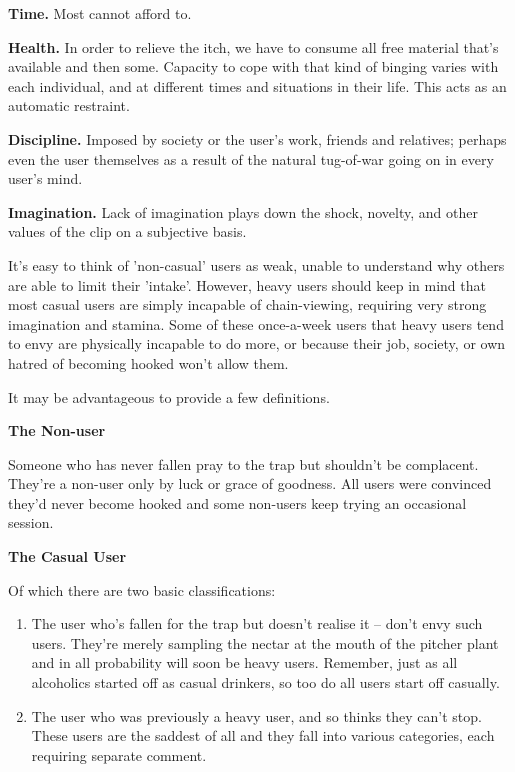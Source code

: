 \documentclass[
]{book}
\begin{document}
\textbf{Time.}
Most cannot afford to.

\textbf{Health.}
In order to relieve the itch, we have to consume all free material that's available and then some. Capacity to cope with that kind of binging varies with each individual, and at different times and situations in their life. This acts as an automatic restraint.

\textbf{Discipline.}
Imposed by society or the user's work, friends and relatives; perhaps even the user themselves as a result of the natural tug-of-war going on in every user's mind.

\textbf{Imagination.}
Lack of imagination plays down the shock, novelty, and other values of the clip on a subjective basis.

It's easy to think of 'non-casual' users as weak, unable to understand why others are able to limit their 'intake'. However, heavy users should keep in mind that most casual users are simply incapable of chain-viewing, requiring very strong imagination and stamina. Some of these once-a-week users that heavy users tend to envy are physically incapable to do more, or because their job, society, or own hatred of becoming hooked won't allow them.

It may be advantageous to provide a few definitions.

\textbf{The Non-user}

Someone who has never fallen pray to the trap but shouldn't be complacent. They're a non-user only by luck or grace of goodness. All users were convinced they'd never become hooked and some non-users keep trying an occasional session.

\textbf{The Casual User}

Of which there are two basic classifications:

\begin{enumerate}
\def\labelenumi{\arabic{enumi}.}
\item
  The user who's fallen for the trap but doesn't realise it -- don't envy such users. They're merely sampling the nectar at the mouth of the pitcher plant and in all probability will soon be heavy users. Remember, just as all alcoholics started off as casual drinkers, so too do all users start off casually.
\item
  The user who was previously a heavy user, and so thinks they can't stop. These users are the saddest of all and they fall into various categories, each requiring separate comment.
\end{enumerate}
\end{document}
